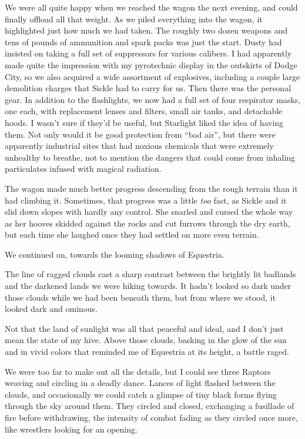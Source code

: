 We were all quite happy when we reached the wagon the next evening, and could finally offload all that weight. As we piled everything into the wagon, it highlighted just how much we had taken. The roughly two dozen weapons and tens of pounds of ammunition and spark packs was just the start. Dusty had insisted on taking a full set of suppressors for various calibers. I had apparently made quite the impression with my pyrotechnic display in the outskirts of Dodge City, so we also acquired a wide assortment of explosives, including a couple large demolition charges that Sickle had to carry for us. Then there was the personal gear. In addition to the flashlights, we now had a full set of four respirator masks, one each, with replacement lenses and filters, small air tanks, and detachable hoods. I wasn’t sure if they’d be useful, but Starlight liked the idea of having them. Not only would it be good protection from “bad air”, but there were apparently industrial sites that had noxious chemicals that were extremely unhealthy to breathe, not to mention the dangers that could come from inhaling particulates infused with magical radiation.

The wagon made much better progress descending from the rough terrain than it had climbing it. Sometimes, that progress was a little \textit{too} fast, as Sickle and it slid down slopes with hardly any control. She snarled and cursed the whole way as her hooves skidded against the rocks and cut furrows through the dry earth, but each time she laughed once they had settled on more even terrain.

We continued on, towards the looming shadows of Equestria.

The line of ragged clouds cast a sharp contrast between the brightly lit badlands and the darkened lands we were hiking towards. It hadn’t looked so dark under those clouds while we had been beneath them, but from where we stood, it looked dark and ominous.

Not that the land of sunlight was all that peaceful and ideal, and I don’t just mean the state of my hive. Above those clouds, basking in the glow of the sun and in vivid colors that reminded me of Equestria at its height, a battle raged.

We were too far to make out all the details, but I could see three Raptors weaving and circling in a deadly dance. Lances of light flashed between the clouds, and occasionally we could catch a glimpse of tiny black forms flying through the sky around them. They circled and closed, exchanging a fusillade of fire before withdrawing, the intensity of combat fading as they circled once more, like wrestlers looking for an opening.

